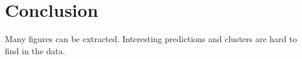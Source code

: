 \section{Conclusion}
\label{sec:conclusion}
 Many figures can be extracted. Interesting predictions and clusters are hard to find in the data.